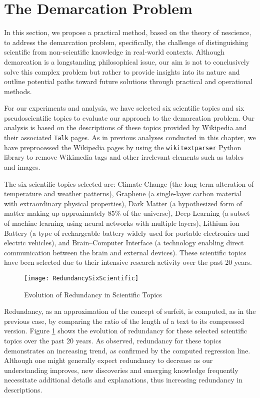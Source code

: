 %
%
\section{The Demarcation Problem}

In this section, we propose a practical method, based on the theory of nescience, to address the demarcation problem, specifically, the challenge of distinguishing scientific from non-scientific knowledge in real-world contexts. Although demarcation is a longstanding philosophical issue, our aim is not to conclusively solve this complex problem but rather to provide insights into its nature and outline potential paths toward future solutions through practical and operational methods.

For our experiments and analysis, we have selected six scientific topics and six pseudoscientific topics to evaluate our approach to the demarcation problem. Our analysis is based on the descriptions of these topics provided by Wikipedia and their associated \texttt{Talk} pages. As in previous analyses conducted in this chapter, we have preprocessed the Wikipedia pages by using the \texttt{wikitextparser} Python library to remove Wikimedia tags and other irrelevant elements such as tables and images.

The six scientific topics selected are: Climate Change (the long-term alteration of temperature and weather patterns), Graphene (a single-layer carbon material with extraordinary physical properties), Dark Matter (a hypothesized form of matter making up approximately 85\% of the universe), Deep Learning (a subset of machine learning using neural networks with multiple layers), Lithium-ion Battery (a type of rechargeable battery widely used for portable electronics and electric vehicles), and Brain–Computer Interface (a technology enabling direct communication between the brain and external devices). These scientific topics have been selected due to their intensive research activity over the past 20 years.

\begin{figure}[H]
\centering\texttt{[image: RedundancySixScientific]}
\caption{\label{fig:redundancy_six_scientific}Evolution of Redundancy in Scientific Topics}
\end{figure}

Redundancy, as an approximation of the concept of surfeit, is computed, as in the previous case, by comparing the ratio of the length of a text to its compressed version. Figure \ref{fig:redundancy_six_scientific} shows the evolution of redundancy for these selected scientific topics over the past 20 years. As observed, redundancy for these topics demonstrates an increasing trend, as confirmed by the computed regression line. Although one might generally expect redundancy to decrease as our understanding improves, new discoveries and emerging knowledge frequently necessitate additional details and explanations, thus increasing redundancy in descriptions.

